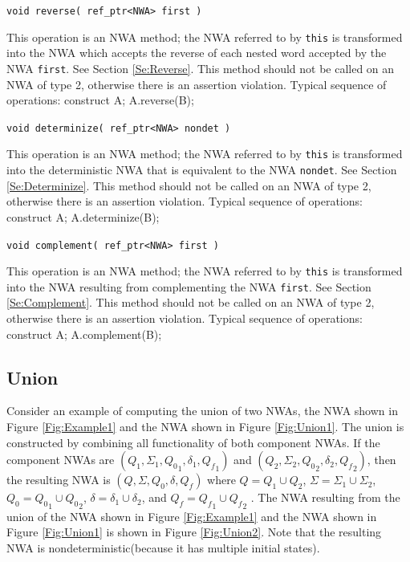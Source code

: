 \documentclass{llncs}
\begin{document}
\begin{description}
  \item\texttt{void reverse( ref\_ptr<NWA> first )}

    This operation is an NWA method; the NWA referred to by \texttt{this} is transformed into the NWA which accepts the reverse of each nested word accepted by the NWA \texttt{first}.  See Section \ref{Se:Reverse}.  This method should not be called on an NWA of type 2, otherwise there is an assertion violation.  Typical sequence of operations: construct A; A.reverse(B);

  \item\texttt{void determinize( ref\_ptr<NWA> nondet )}

    This operation is an NWA method; the NWA referred to by \texttt{this} is transformed into the deterministic NWA that is equivalent to the NWA \texttt{nondet}.  See Section \ref{Se:Determinize}.  This method should not be called on an NWA of type 2, otherwise there is an assertion violation.  Typical sequence of operations: construct A; A.determinize(B);

  \item\texttt{void complement( ref\_ptr<NWA> first )}

    This operation is an NWA method; the NWA referred to by \texttt{this} is transformed into the NWA resulting from complementing the NWA \texttt{first}.  See Section \ref{Se:Complement}.  This method should not be called on an NWA of type 2, otherwise there is an assertion violation.  Typical sequence of operations: construct A; A.complement(B);

\end{description}

\subsection{Union}
\label{Se:Union}
Consider an example of computing the union of two NWAs, the NWA shown in Figure \ref{Fig:Example1} and the NWA shown in Figure \ref{Fig:Union1}.  The union is constructed by combining all functionality of both component NWAs.  If the component NWAs are $(Q_1, \Sigma_1, {Q_0}_1, \delta_1, {Q_f}_1)$ and $(Q_2, \Sigma_2, {Q_0}_2, \delta_2, {Q_f}_2)$, then the resulting NWA is $(Q, \Sigma, Q_0, \delta, Q_f)$ where $Q = Q_1 \cup Q_2$, $\Sigma = \Sigma_1 \cup \Sigma_2$, $Q_0 = {Q_0}_1 \cup {Q_0}_2$, $\delta = \delta_1 \cup \delta_2$, and $Q_f = {Q_f}_1 \cup {Q_f}_2$ .  The NWA resulting from the union of the NWA shown in Figure \ref{Fig:Example1} and the NWA shown in Figure \ref{Fig:Union1} is shown in Figure \ref{Fig:Union2}.  Note that the resulting NWA is nondeterministic(because it has multiple initial states).  
\end{document}
